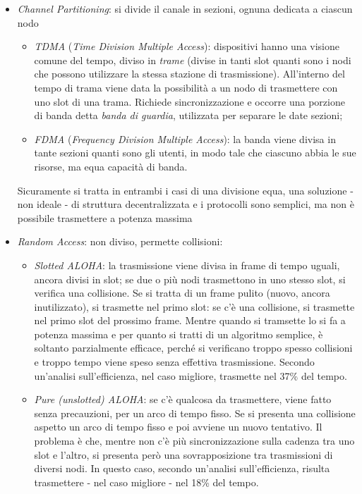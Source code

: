 \begin{itemize}
	\item \textit{Channel Partitioning}: si divide il canale in sezioni, ognuna dedicata a ciascun nodo
	\begin{itemize}
		\item \textit{TDMA} (\textit{Time Division Multiple Access}): dispositivi hanno una visione comune del tempo, diviso in \textit{trame} (divise in tanti slot quanti sono i nodi che possono utilizzare la stessa stazione di trasmissione). All'interno del tempo di trama viene data la possibilità a un nodo di trasmettere con uno slot di una trama. Richiede sincronizzazione e occorre una porzione di banda detta \textit{banda di guardia}, utilizzata per separare le date sezioni;
		\item \textit{FDMA} (\textit{Frequency Division Multiple Access}): la banda viene divisa in tante sezioni quanti sono gli utenti, in modo tale che ciascuno abbia le sue risorse, ma equa capacità di banda. 
	\end{itemize}
	Sicuramente si tratta in entrambi i casi di una divisione equa, una soluzione - non ideale - di struttura decentralizzata e i protocolli sono semplici, ma non è possibile trasmettere a potenza massima 
	\item \textit{Random Access}: non diviso, permette collisioni:
	\begin{itemize}
		\item \textit{Slotted ALOHA}: la trasmissione viene divisa in frame di tempo uguali, ancora divisi in slot; se due o più nodi trasmettono in uno stesso slot, si verifica una collisione. Se si tratta di un frame pulito (nuovo, ancora inutilizzato), si trasmette nel primo slot: se c'è una collisione, si trasmette nel primo slot del prossimo frame. Mentre quando si tramsette lo si fa a potenza massima e per quanto si tratti di un algoritmo semplice, è soltanto parzialmente efficace, perché si verificano troppo spesso collisioni e troppo tempo viene speso senza effettiva trasmissione. Secondo un'analisi sull'efficienza, nel caso migliore, trasmette nel 37\% del tempo.
		\item \textit{Pure (unslotted) ALOHA}: se c'è qualcosa da trasmettere, viene fatto senza precauzioni, per un arco di tempo fisso. Se si presenta una collisione aspetto un arco di tempo fisso e poi avviene un nuovo tentativo. Il problema è che, mentre non c'è più sincronizzazione sulla cadenza tra uno slot e l'altro, si presenta però una sovrapposizione tra trasmissioni di diversi nodi. In questo caso, secondo un'analisi sull'efficienza, risulta trasmettere - nel caso migliore - nel 18\% del tempo.

\end{itemize}
\end{itemize}
